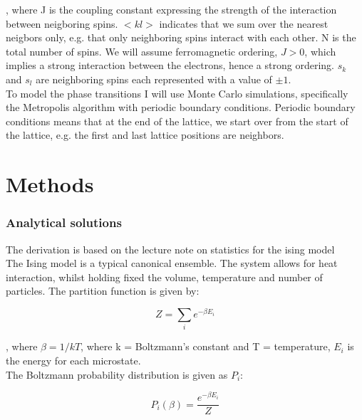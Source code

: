 , where J is the coupling constant expressing the strength of the interaction between neigboring spins. $<kl>$ indicates that we sum over the nearest neigbors only, e.g. that only neighboring spins interact with each other. N is the total number of spins. We will assume ferromagnetic ordering, 
$J > 0$, which implies a strong interaction between the electrons, hence a strong ordering. $s_k$ and $s_l$ are neighboring spins each represented with a value of $\pm 1$.\\




To model the phase transitions I will use Monte Carlo simulations, specifically the Metropolis algorithm with periodic boundary conditions. Periodic boundary conditions means that at the end of the lattice, we start over from the start of the lattice, e.g. the first and last lattice positions are neighbors.\\





\section{Methods}
\subsubsection{Analytical solutions}
The derivation is based on the lecture note on statistics for the ising model \cite{isingstat}\\



The Ising model is a typical canonical ensemble. The system allows for heat interaction, whilst holding fixed the volume, temperature and number of particles. The partition function is given by:

\begin{equation}
Z = \sum_ie^{-\beta E_i} 
\end{equation}

, where $\beta = 1/kT$, where k = Boltzmann's constant and T = temperature, $E_i$ is the energy for each microstate.\\


The Boltzmann probability distribution is given as $P_i$:

\begin{equation}
P_i(\beta) = \frac{e^{-\beta E_i}}{Z} 
\end{equation}\\


